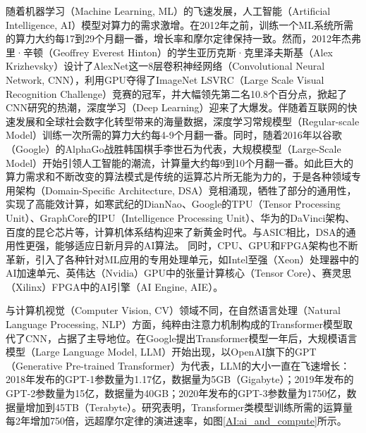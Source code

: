 随着机器学习（Machine Learning, ML）的飞速发展，人工智能（Artificial Intelligence, AI）模型对算力的需求激增。在2012年之前，训练一个ML系统所需的算力大约每17到29个月翻一番\cite{AI:computing_demand_trend}，增长率和摩尔定律保持一致。然而，2012年杰弗里·辛顿（Geoffrey Everest Hinton）的学生亚历克斯·克里泽夫斯基（Alex Krizhevsky）设计了AlexNet\cite{AI:AlexNet}这一8层卷积神经网络（Convolutional Neural Network, CNN），利用GPU夺得了ImageNet LSVRC（Large Scale Visual Recognition Challenge）竞赛的冠军，并大幅领先第二名10.8个百分点，掀起了CNN研究的热潮，深度学习（Deep Learning）迎来了大爆发。伴随着互联网的快速发展和全球社会数字化转型带来的海量数据，深度学习常规模型（Regular-scale Model）训练一次所需的算力大约每4-9个月翻一番\cite{AI:computing_demand_trend}。同时，随着2016年以谷歌（Google）的AlphaGo\cite{AI:AlphaGo}战胜韩国棋手李世石为代表，大规模模型（Large-Scale Model）开始引领人工智能的潮流，计算量大约每9到10个月翻一番\cite{AI:computing_demand_trend}。如此巨大的算力需求和不断改变的算法模式是传统的运算芯片所无能为力的，于是各种领域专用架构（Domain-Specific Architecture, DSA）竞相涌现，牺牲了部分的通用性，实现了高能效计算，如寒武纪的DianNao\cite{Accelerator:DianNao}、Google的TPU（Tensor Processing Unit）\cite{Accelerator:TPU}、GraphCore的IPU（Intelligence Processing Unit）\cite{Accelerator:IPU}、华为的DaVinci架构\cite{Accelerator:DaVinci}、百度的昆仑芯片\cite{Accelerator:Kunlun}等，计算机体系结构迎来了新黄金时代\cite{new_golden}。与ASIC相比，DSA的通用性更强，能够适应日新月异的AI算法。
同时，CPU、GPU和FPGA架构也不断革新，引入了各种针对ML应用的专用处理单元，如Intel至强（Xeon）处理器中的AI加速单元\cite{Accelerator:intel_xeon_4th}、英伟达（Nvidia）GPU中的张量计算核心（Tensor Core）\cite{Accelerator:nvdia_h100_tensor_core_4th}、赛灵思（Xilinx）FPGA中的AI引擎（AI Engine, AIE）\cite{Accelerator:amd_versal_AIE}。

与计算机视觉（Computer Vision, CV）领域不同，在自然语言处理（Natural Language Processing, NLP）方面，纯粹由注意力机制构成的Transformer模型\cite{AI:attention_is_all}取代了CNN，占据了主导地位。在Google提出Transformer模型一年后，大规模语言模型（Large Language Model, LLM）开始出现，以OpenAI旗下的GPT（Generative Pre-trained Transformer）为代表，LLM的大小一直在飞速增长：2018年发布的GPT-1参数量为1.17亿，数据量为5GB（Gigabyte）；2019年发布的GPT-2参数量为15亿，数据量为40GB；2020年发布的GPT-3参数量为1750亿，数据量增加到45TB（Terabyte）。研究表明，Transformer类模型训练所需的运算量每2年增加750倍，远超摩尔定律的演进速率，如图\ref{AI:ai_and_compute}所示\cite{ai_and_memory_wall}。

